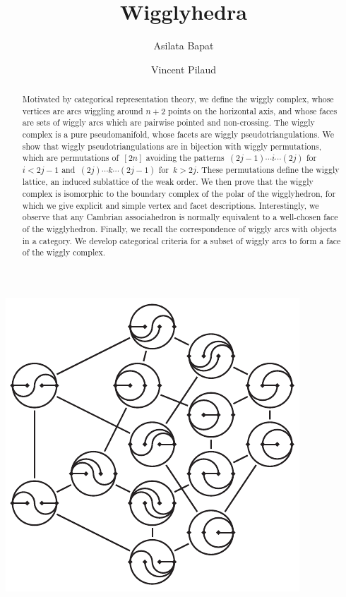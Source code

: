 \documentclass{amsart}
\title{Wigglyhedra}
\author{Asilata Bapat}
\author{Vincent Pilaud}
\theoremstyle{definition}
\begin{document}
\begin{abstract}
  Motivated by categorical representation theory, we define the wiggly complex, whose vertices are arcs wiggling around $n+2$ points on the horizontal axis, and whose faces are sets of wiggly arcs which are pairwise pointed and non-crossing. The wiggly complex is a pure pseudomanifold, whose facets are wiggly pseudotriangulations. We show that wiggly pseudotriangulations are in bijection with wiggly permutations, which are permutations of~$[2n]$ avoiding the patterns~$(2j-1) \cdots i \cdots (2j)$ for~$i < 2j-1$ and~$(2j) \cdots k \cdots (2j-1)$ for~$k > 2j$. These permutations define the wiggly lattice, an induced sublattice of the weak order. We then prove that the wiggly complex is isomorphic to the boundary complex of the polar of the wigglyhedron, for which we give explicit and simple vertex and facet descriptions. Interestingly, we observe that any Cambrian associahedron is normally equivalent to a well-chosen face of the wigglyhedron. Finally, we recall the correspondence of wiggly arcs with objects in a category. We develop categorical criteria for a subset of wiggly arcs to form a face of the wiggly complex.
\end{abstract}

\maketitle

\centerline{\includegraphics[scale=1.6]{wigglyFlipGraph}}
\end{document}
